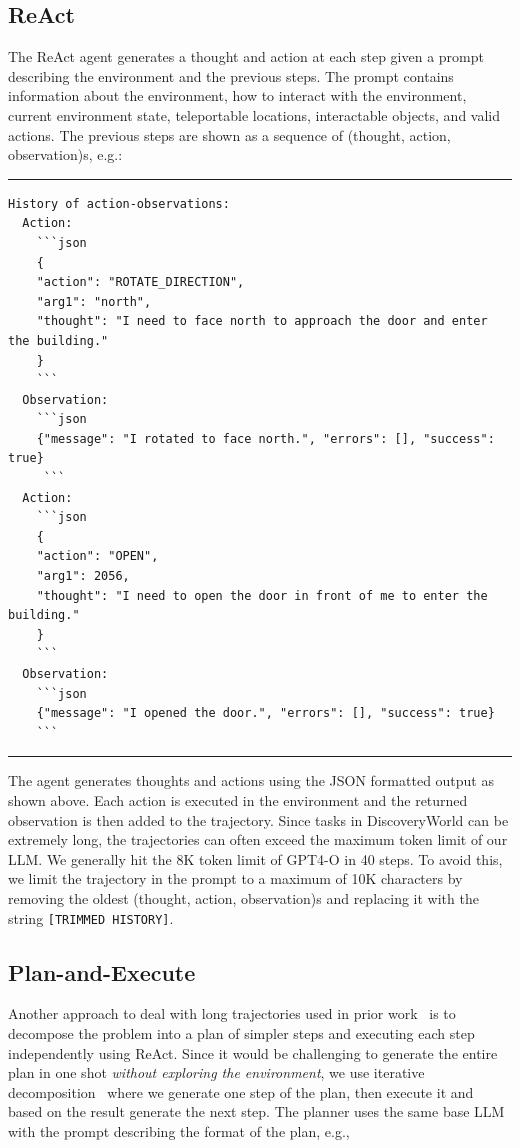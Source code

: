 \documentclass{article}
\begin{document}
\subsection{ReAct}
The ReAct agent generates a thought and action at each step given a prompt describing the environment and the previous steps. The prompt contains information about the environment, how to interact with the environment, current environment state, teleportable locations, interactable objects, and valid actions. The previous steps are shown as a sequence of (thought, action, observation)s, e.g.:

\rule{\textwidth}{0.5pt}
\begin{footnotesize}
\begin{verbatim}
History of action-observations:
  Action:
    ```json
    {
    "action": "ROTATE_DIRECTION",
    "arg1": "north",
    "thought": "I need to face north to approach the door and enter the building."
    }
    ```
  Observation:
    ```json
    {"message": "I rotated to face north.", "errors": [], "success": true}
     ```
  Action:
    ```json
    {
    "action": "OPEN",
    "arg1": 2056,
    "thought": "I need to open the door in front of me to enter the building."
    }
    ```
  Observation:
    ```json
    {"message": "I opened the door.", "errors": [], "success": true}
    ```
\end{verbatim}
\end{footnotesize}
\rule{\textwidth}{0.5pt}

The agent generates thoughts and actions using the JSON formatted output as shown above. Each action is executed in the environment and the returned observation is then added to the trajectory. Since tasks in DiscoveryWorld can be extremely long, the trajectories can often exceed the maximum token limit of our LLM. We generally hit the 8K token limit of GPT4-O in 40 steps. To avoid this, we limit the trajectory in the prompt to a maximum of 10K characters by removing the oldest (thought, action, observation)s and replacing it with the string \texttt{[TRIMMED HISTORY]}.




\subsection{Plan-and-Execute}
Another approach to deal with long trajectories used in prior work~\cite{intercode,adapt} is to decompose the problem into a plan of simpler steps and executing each step independently using ReAct. Since it would be challenging to generate the entire plan in one shot \emph{without exploring the environment}, we use iterative decomposition~\cite{decomp} where we generate one step of the plan, then execute it and based on the result generate the next step. The planner uses the same base LLM with the prompt describing the format of the plan, e.g., 
\end{document}
